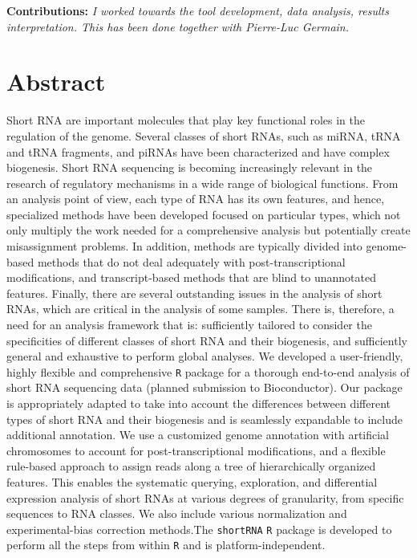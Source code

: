 \documentclass[12pt,twoside]{reedthesis}
\begin{document}
\textbf{Contributions:} \emph{I worked towards the tool development, data analysis, results interpretation. This has been done together with Pierre-Luc Germain.}

\hypertarget{abstract}{%
\section{Abstract}\label{abstract}}

Short RNA are important molecules that play key functional roles in the
regulation of the genome. Several classes of short RNAs, such as miRNA,
tRNA and tRNA fragments, and piRNAs have been characterized and have
complex biogenesis. Short RNA sequencing is becoming increasingly
relevant in the research of regulatory mechanisms in a wide range of
biological functions. From an analysis point of view, each type of RNA
has its own features, and hence, specialized methods have been developed
focused on particular types, which not only multiply the work needed for
a comprehensive analysis but potentially create misassignment problems.
In addition, methods are typically divided into genome-based methods
that do not deal adequately with post-transcriptional modifications, and
transcript-based methods that are blind to unannotated features.
Finally, there are several outstanding issues in the analysis of short
RNAs, which are critical in the analysis of some samples. There is,
therefore, a need for an analysis framework that is: sufficiently
tailored to consider the specificities of different classes of short RNA
and their biogenesis, and sufficiently general and exhaustive to perform
global analyses. We developed a user-friendly, highly flexible and
comprehensive \texttt{R} package for a thorough end-to-end analysis of short RNA
sequencing data (planned submission to Bioconductor). Our package is
appropriately adapted to take into account the differences between
different types of short RNA and their biogenesis and is seamlessly
expandable to include additional annotation. We use a customized genome
annotation with artificial chromosomes to account for
post-transcriptional modifications, and a flexible rule-based approach
to assign reads along a tree of hierarchically organized features. This
enables the systematic querying, exploration, and differential
expression analysis of short RNAs at various degrees of granularity,
from specific sequences to RNA classes. We also include various
normalization and experimental-bias correction methods.The \texttt{shortRNA} \texttt{R} package is developed to perform all the steps from within \texttt{R} and is
platform-independent.
\end{document}
